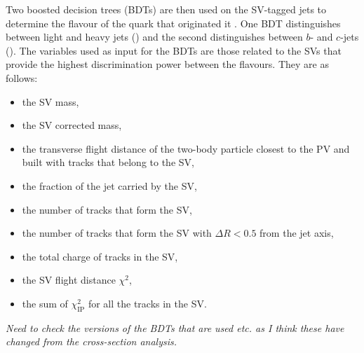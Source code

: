 Two boosted decision trees (BDTs) are then used on the SV-tagged jets to determine the flavour of the quark that originated it \cite{Breiman, Roe:2004na, Freund:1997xna}. One BDT distinguishes between light and heavy jets (\bdtlh) and the second distinguishes between $b$- and $c$-jets (\bdtbc). The variables used as input for the BDTs are those related to the SVs that provide the highest discrimination power between the flavours. They are as follows:
\begin{itemize}
    \item the SV mass,
    \item the SV corrected mass,
    \item the transverse flight distance of the two-body particle closest to the PV and built with tracks that belong to the SV,
    \item the fraction of the jet \pt carried by the SV,
    \item the number of tracks that form the SV,
    \item the number of tracks that form the SV with $\Delta R<0.5$ from the jet axis,
    \item the total charge of tracks in the SV,
    \item the SV flight distance $\chi^2$,
    \item the sum of $\chi^2_{\text{IP}}$ for all the tracks in the SV.
\end{itemize}

\textit{Need to check the versions of the BDTs that are used etc. as I think these have changed from the cross-section analysis.}